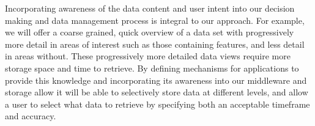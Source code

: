 \documentclass[11pt,letterpaper]{article}
\newcommand{\hasan}[1]{{\it \color{darkgreen} #1 -Hasan }}
\newcommand{\hasan}[1]{}
\begin{document}

Incorporating awareness of the data content and user intent  into
our decision making and data management process is integral to our approach. For example, 
we will offer a coarse grained, quick overview of a data set with progressively more detail in 
areas of interest such as those containing features, and less detail in areas
without. These progressively more detailed data views require more storage
space and time to retrieve. By defining mechanisms for applications to provide this 
knowledge and incorporating its awareness into our middleware  and storage allow
it will be able to selectively store data at different  levels, and allow a user to select what data to retrieve by specifying both an acceptable  timeframe and accuracy.


\end{document}
